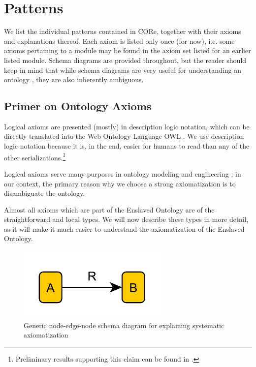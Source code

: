 \chapter{Patterns}
\label{sec:pats}
We list the individual patterns contained in CORe, together with their axioms and explanations thereof. Each axiom is listed only once (for now), i.e. some axioms pertaining to a module may be found in the axiom set listed for an earlier listed module. Schema diagrams are provided throughout, but the reader should keep in mind that while schema diagrams are very useful for understanding an ontology \cite{odp-documentation}, they are also inherently ambiguous.

\section*{Primer on Ontology Axioms}

Logical axioms are presented (mostly) in description logic notation, which can be directly translated into the Web Ontology Language OWL \cite{FOST}. We use description logic notation because it is, in the end, easier for humans to read than any of the other serializations.\footnote{Preliminary results supporting this claim can be found in \cite{ShimizuMS}.} 

Logical axioms serve many purposes in ontology modeling and engineering \cite{HitzlerK16};  in our context, the primary reason why we choose a strong axiomatization is to disambiguate the ontology.

Almost all axioms which are part of the Enslaved Ontology are of the straightforward and local types. We will now describe these types in more detail, as it will make it much easier to understand the axiomatization of the Enslaved Ontology.

\bigskip

\begin{figure}[tb]
\begin{center}
\includegraphics[width=.3\textwidth]{figures/02-ARB}
\caption{Generic node-edge-node schema diagram for explaining systematic axiomatization}\label{fig:rec-ARB}
\end{center}
\end{figure}

